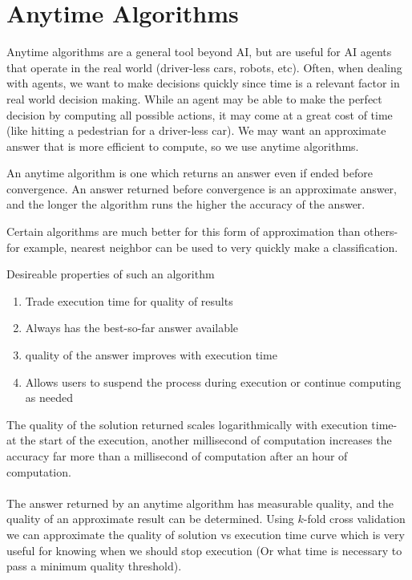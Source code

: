 \documentclass{chezarticle}
\begin{document}
\section{Anytime Algorithms}
Anytime algorithms are a general tool beyond AI, but are useful for AI agents that operate in the real world (driver-less cars, robots, etc). Often, when dealing with agents, we want to make decisions quickly since time is a relevant factor in real world decision making. While an agent may be able to make the perfect decision by computing all possible actions, it may come at a great cost of time (like hitting a pedestrian for a driver-less car). We may want an approximate answer that is more efficient to compute, so we use anytime algorithms.
\begin{definition}
An anytime algorithm is one which returns an answer even if ended before convergence. An answer returned before convergence is an approximate answer, and the longer the algorithm runs the higher the accuracy of the answer. 
\end{definition}
Certain algorithms are much better for this form of approximation than others- for example, nearest neighbor can be used to very quickly make a classification.
\begin{note}
Desireable properties of such an algorithm
\begin{enumerate}
    \item Trade execution time for quality of results
    \item Always has the best-so-far answer available
    \item quality of the answer improves with execution time
    \item Allows users to suspend the process during execution or continue computing as needed
\end{enumerate}
\end{note}
The quality of the solution returned scales logarithmically with execution time- at the start of the execution, another millisecond of computation increases the accuracy far more than a millisecond of computation after an hour of computation.\\
\\
The answer returned by an anytime algorithm has measurable quality, and the quality of an approximate result can be determined. Using $k$-fold cross validation we can approximate the quality of solution vs execution time curve which is very useful for knowing when we should stop execution (Or what time is necessary to pass a minimum quality threshold). 
\end{document}
